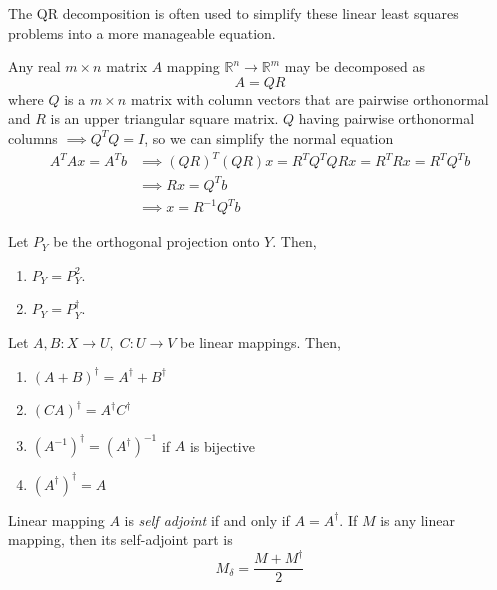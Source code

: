 \documentclass{article}
\begin{document}
    The QR decomposition is often used to simplify these linear least squares problems into a more manageable equation. 

    \begin{theorem}[QR Decomposition]
    Any real $m \times n$ matrix $A$ mapping $\mathbb{R}^n \longrightarrow \mathbb{R}^m$ may be decomposed as
    \[A = Q R\] 
    where $Q$ is a $m \times n$ matrix with column vectors that are pairwise orthonormal and $R$ is an upper triangular square matrix. $Q$ having pairwise orthonormal columns $\implies Q^T Q = I$, so we can simplify the normal equation
    \begin{align*}
        A^T A x = A^T b & \implies (Q R)^T (Q R) x = R^T Q^T Q R x = R^T R x = R^T Q^T b \\
        & \implies R x = Q^T b \\
        & \implies x = R^{-1} Q^T b
    \end{align*}
    \end{theorem}

    \begin{theorem}
    Let $P_Y$ be the orthogonal projection onto $Y$. Then, 
    \begin{enumerate}
        \item $P_Y = P_Y^2$. 
        \item $P_Y = P_Y^\dagger$. 
    \end{enumerate}
    \end{theorem}

    \begin{theorem} Let $A, B: X \longrightarrow U, \; C: U \longrightarrow V$ be linear mappings. Then, 
    \begin{enumerate}
        \item $(A + B)^\dagger = A^\dagger + B^\dagger$
        \item $(C A)^\dagger = A^\dagger C^\dagger$
        \item $(A^{-1})^\dagger = (A^\dagger)^{-1}$ if $A$ is bijective
        \item $(A^\dagger)^\dagger = A$
    \end{enumerate}
    \end{theorem}

    \begin{definition}
    Linear mapping $A$ is \textit{self adjoint} if and only if $A = A^\dagger$. If $M$ is any linear mapping, then its self-adjoint part is 
    \[M_\delta = \frac{M + M^\dagger}{2}\]
    \end{definition}
\end{document}

